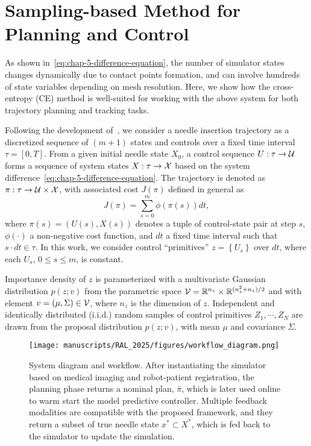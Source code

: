 \section{Sampling-based Method for Planning and Control}
\label{sec:chap-5-cross-entropy}
As shown in~\cref{eq:chap-5-difference-equation}, the number of simulator states changes dynamically due to contact points formation, and can involve hundreds of state variables depending on mesh resolution. Here, we show how the cross-entropy (CE) method is well-suited for working with the above system for both trajectory planning and tracking tasks.

Following the development of~\parencite{kobilarovCrossEntropyMotionPlanning2012}, we consider a needle insertion trajectory as a discretized sequence of $(m + 1)$ states and controls over a fixed time interval $\tau = [0, T]$. From a given initial needle state $X_0$, a control sequence $U: \tau\to \mathcal{U}$ forms a sequence of system states $X: \tau\to \mathcal{X}$ based on the system difference~\cref{eq:chap-5-difference-equation}. The trajectory is denoted as $\pi: \tau\to \mathcal{U}\times \mathcal{X}$, with associated cost $J(\pi)$ defined in general as
\begin{equation}
  \label{eq:chap-5-general-cost}
  J(\pi) = \sum_{s = 0}^m \phi \left( \pi(s) \right)dt,
\end{equation}
where $\pi(s) = \left( U(s), X(s) \right)$ denotes a tuple of control-state pair at step $s$, $\phi(\cdot)$ a non-negative cost function, and $dt$ a fixed time interval such that $s\cdot dt \in \tau$. In this work, we consider control ``primitives'' $z = \left\{ U_s \right\}$ over $dt$, where each $U_s$, $ 0 \leq s \leq m$, is constant.

Importance density of $z$ is parameterized with a multivariate Gaussian distribution $p(z; v)$ from the parametric space $\mathcal{V} = \mathbb{R}^{n_z}\times \mathbb{R}^{(n_z^2 + n_z)/2}$ and with element $v = \left( \mu, \Sigma \right) \in \mathcal{V}$, where $n_z$ is the dimension of $z$. Independent and identically distributed (i.i.d.) random samples of control primitives $Z_1, \cdots, Z_N$ are drawn from the proposal distribution $p(z; v)$, with mean $\mu$ and covariance $\Sigma$.

\begin{figure}[h]
  \centering
  \texttt{[image: manuscripts/RAL\_2025/figures/workflow\_diagram.png]}
  \caption{System diagram and workflow. After instantiating the simulator based on medical imaging and robot-patient registration, the planning phase returns a nominal plan, $\bar{\pi}$, which is later used online to warm start the model predictive controller. Multiple feedback modalities are compatible with the proposed framework, and they return a subset of true needle state $x^{*} \subset X^{*}$, which is fed back to the simulator to update the simulation.}
  \label{fig:chap-5-feedback-modalities}
\end{figure}

